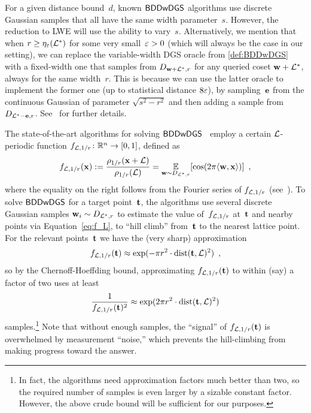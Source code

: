 \documentclass{iacrcc}
\begin{document}
\begin{remark}
  \label{rem:BDDwDGS-param}
  For a given distance bound~$d$, known $\mathsf{BDDwDGS}$ algorithms use
  discrete Gaussian samples that all have the same width
  parameter~$s$. However, the reduction to LWE will use the ability to
  vary~$s$. Alternatively, we mention that when
  $r \geq \eta_{\varepsilon}(\mathcal{L}^{*})$ for some very
  small~$\varepsilon > 0$ (which will always be the case in our setting),
  we can replace the variable-width DGS oracle from
  \autoref{def:BDDwDGS} with a fixed-width one that samples from
  $D_{\mathbf{w}+\mathcal{L}^{*},r}$ for any queried coset $\mathbf{w}+\mathcal{L}^{*}$,
  always for the same width~$r$.  This is because we can use the
  latter oracle to implement the former one (up to statistical
  distance $8\varepsilon$), by sampling~$\mathbf{e}$ from the continuous
  Gaussian of parameter $\sqrt{s^{2}-r^{2}}$ and then adding a sample
  from $D_{\mathcal{L}^{*}-\mathbf{e},r}$. See~\cite[Theorem~3.1]{C:Peikert10} for
  further details.
\end{remark}

The state-of-the-art algorithms for solving
$\mathsf{BDDwDGS}$~\cite{DBLP:journals/jacm/AharonovR05,DBLP:conf/approx/LiuLM06,DBLP:conf/coco/DadushRS14}
employ a certain $\mathcal{L}$-periodic function
$f_{\mathcal{L},1/r} \colon \mathbb{R}^{n} \to [0,1]$, defined as
\begin{equation}
  \label{eq:f_L}
  f_{\mathcal{L},1/r}(\mathbf{x}) := \frac{\rho_{1/r}(\mathbf{x}+\mathcal{L})}{\rho_{1/r}(\mathcal{L})} =
  \operatorname*{\mathbb{E}}_{\mathbf{w} \sim D_{\mathcal{L}^{*},r}}[\cos(2\pi \langle\mathbf{w}, \mathbf{x}\rangle)] \enspace ,
\end{equation}
where the equality on the right follows from the Fourier series of
$f_{\mathcal{L},1/r}$ (see~\cite{DBLP:journals/jacm/AharonovR05}).  To solve
$\mathsf{BDDwDGS}$ for a target point~$\mathbf{t}$, the algorithms use several
discrete Gaussian samples $\mathbf{w}_{i} \sim D_{\mathcal{L}^{*},r}$ to estimate
the value of~$f_{\mathcal{L},1/r}$ at~$\mathbf{t}$ and nearby points via
Equation~\eqref{eq:f_L}, to ``hill climb'' from~$\mathbf{t}$ to the nearest
lattice point.  For the relevant points~$\mathbf{t}$ we have the (very
sharp) approximation
\[ f_{\mathcal{L},1/r}(\mathbf{t}) \approx \exp(-\pi r^{2} \cdot
  \operatorname{dist}(\mathbf{t},\mathcal{L})^{2}) \enspace , \] so by the Chernoff-Hoeffding
bound, approximating $f_{\mathcal{L},1/r}(\mathbf{t})$ to within (say) a factor of
two uses at least
\[ \frac{1}{f_{\mathcal{L},1/r}(\mathbf{t})^{2}} \approx \exp(2\pi r^{2} \cdot
  \operatorname{dist}(\mathbf{t},\mathcal{L})^{2}) \] samples.\footnote{In fact, the algorithms
  need approximation factors much better than two, so the required
  number of samples is even larger by a sizable constant
  factor. However, the above crude bound will be sufficient for our
  purposes.}  Note that without enough samples, the ``signal'' of
$f_{\mathcal{L},1/r}(\mathbf{t})$ is overwhelmed by measurement ``noise,'' which
prevents the hill-climbing from making progress toward the answer.
\end{document}

